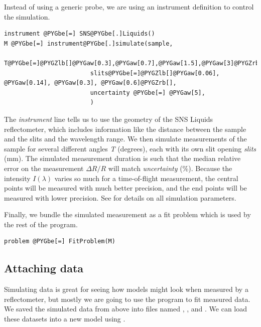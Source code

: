 \documentclass[letterpaper,10pt,english]{sphinxmanual}
\begin{document}
Instead of using a generic probe, we are using an instrument definition
to control the simulation.

\begin{Verbatim}[commandchars=@\[\]]
instrument @PYGbe[=] SNS@PYGbe[.]Liquids()
M @PYGbe[=] instrument@PYGbe[.]simulate(sample,
                        T@PYGbe[=]@PYGZlb[]@PYGaw[0.3],@PYGaw[0.7],@PYGaw[1.5],@PYGaw[3]@PYGZrb[],
                        slits@PYGbe[=]@PYGZlb[]@PYGaw[0.06], @PYGaw[0.14], @PYGaw[0.3], @PYGaw[0.6]@PYGZrb[],
                        uncertainty @PYGbe[=] @PYGaw[5],
                        )
\end{Verbatim}

The \emph{instrument} line tells us to use the geometry of the SNS Liquids
reflectometer, which includes information like the distance between the
sample and the slits and the wavelength range.  We then simulate measurements
of the sample for several different angles \emph{T} (degrees), each with its
own slit opening \emph{slits} (mm).  The simulated measurement duration is
such that the median relative error on the measurement $\Delta R/R$
will match \emph{uncertainty} (\%).  Because the intensity $I(\lambda)$ varies
so much for a time-of-flight measurement, the central points will be
measured with much better precision, and the end points will be measured
with lower precision.  See
{\hyperref[api/instrument:refl1d.instrument.Pulsed.simulate]{}} for details
on all simulation parameters.

Finally, we bundle the simulated measurement as a fit problem which
is used by the rest of the program.

\begin{Verbatim}[commandchars=@\[\]]
problem @PYGbe[=] FitProblem(M)
\end{Verbatim}


\subsection{Attaching data}
\label{examples/ex1/nifilm-data:attaching-data}\label{examples/ex1/nifilm-data::doc}
Simulating data is great for seeing how models might look when measured
by a reflectometer, but mostly we are going to use the program to fit
measured data.  We saved the simulated data from above into files named
, ,
 and .
We can load these datasets into a new model using
.
\end{document}
